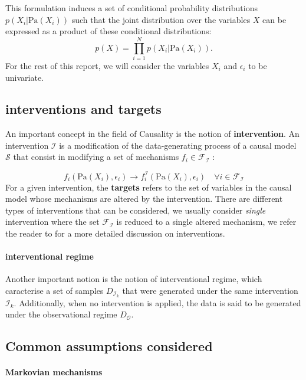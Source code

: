 \documentclass{article}
\begin{document}
This formulation induces a set of conditional probability distributions $p(X_i | \text{Pa}(X_i))$ such that the joint distribution over the variables $X$ can be expressed as a product of these conditional distributions:
$$p(X) = \prod_{i = 1}^N p(X_i | \text{Pa}(X_i)).$$
For the rest of this report, we will consider the variables $X_i$ and $\epsilon_i$ to be univariate.

\subsection{interventions and targets}
An important concept in the field of Causality is the notion of \textbf{intervention}. An intervention $\mathcal{I}$ is a modification of the data-generating process of a causal model $\mathcal{S}$ that consist in modifying a set of mechanisms $f_i \in \mathcal{F}_{\mathcal{I}}$ :

\begin{equation}
    f_i(\text{Pa}(X_i), \epsilon_i) \rightarrow f_i^{\mathcal{I}}(\text{Pa}(X_i), \epsilon_i) \quad \forall i \in \mathcal{F}_{\mathcal{I}}
\end{equation}
For a given intervention, the \textbf{targets} refers to the set of variables in the causal model whose mechanisms are altered by the intervention. There are different types of interventions that can be considered, we usually consider \textit{single} intervention where the set $\mathcal{F}_{\mathcal{I}}$ is reduced to a single altered mechanism, we refer the reader to \citet{Pearl_2009} for a more detailed discussion on interventions.

\paragraph{interventional regime}
Another important notion is the notion of interventional regime, which caracterise a set of samples $D_{\mathcal{I}_k}$  that were generated under the same intervention $\mathcal{I}_k$. Additionally, when no intervention is applied, the data is said to be generated under the observational regime $D_{\mathcal{O}}$.


\subsection{Common assumptions considered}

\paragraph{Markovian mechanisms}
\end{document}
